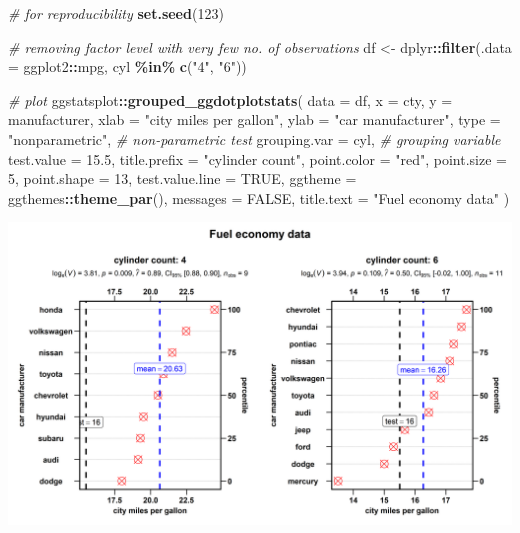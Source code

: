 \documentclass[
]{article}
\newenvironment{Shaded}{\begin{snugshade}}{\end{snugshade}}
\newcommand{\CommentTok}[1]{\textcolor[rgb]{0.56,0.35,0.01}{\textit{#1}}}
\newcommand{\DataTypeTok}[1]{\textcolor[rgb]{0.13,0.29,0.53}{#1}}
\newcommand{\DecValTok}[1]{\textcolor[rgb]{0.00,0.00,0.81}{#1}}
\newcommand{\FloatTok}[1]{\textcolor[rgb]{0.00,0.00,0.81}{#1}}
\newcommand{\KeywordTok}[1]{\textcolor[rgb]{0.13,0.29,0.53}{\textbf{#1}}}
\newcommand{\NormalTok}[1]{#1}
\newcommand{\OperatorTok}[1]{\textcolor[rgb]{0.81,0.36,0.00}{\textbf{#1}}}
\newcommand{\OtherTok}[1]{\textcolor[rgb]{0.56,0.35,0.01}{#1}}
\newcommand{\StringTok}[1]{\textcolor[rgb]{0.31,0.60,0.02}{#1}}
\begin{document}
\begin{Shaded}
\begin{Highlighting}[]
\CommentTok{\# for reproducibility}
\KeywordTok{set.seed}\NormalTok{(}\DecValTok{123}\NormalTok{)}

\CommentTok{\# removing factor level with very few no. of observations}
\NormalTok{df <{-}}\StringTok{ }\NormalTok{dplyr}\OperatorTok{::}\KeywordTok{filter}\NormalTok{(}\DataTypeTok{.data =}\NormalTok{ ggplot2}\OperatorTok{::}\NormalTok{mpg, cyl }\OperatorTok{\%in\%}\StringTok{ }\KeywordTok{c}\NormalTok{(}\StringTok{"4"}\NormalTok{, }\StringTok{"6"}\NormalTok{))}

\CommentTok{\# plot}
\NormalTok{ggstatsplot}\OperatorTok{::}\KeywordTok{grouped\_ggdotplotstats}\NormalTok{(}
  \DataTypeTok{data =}\NormalTok{ df,}
  \DataTypeTok{x =}\NormalTok{ cty,}
  \DataTypeTok{y =}\NormalTok{ manufacturer,}
  \DataTypeTok{xlab =} \StringTok{"city miles per gallon"}\NormalTok{,}
  \DataTypeTok{ylab =} \StringTok{"car manufacturer"}\NormalTok{,}
  \DataTypeTok{type =} \StringTok{"nonparametric"}\NormalTok{, }\CommentTok{\# non{-}parametric test}
  \DataTypeTok{grouping.var =}\NormalTok{ cyl, }\CommentTok{\# grouping variable}
  \DataTypeTok{test.value =} \FloatTok{15.5}\NormalTok{,}
  \DataTypeTok{title.prefix =} \StringTok{"cylinder count"}\NormalTok{,}
  \DataTypeTok{point.color =} \StringTok{"red"}\NormalTok{,}
  \DataTypeTok{point.size =} \DecValTok{5}\NormalTok{,}
  \DataTypeTok{point.shape =} \DecValTok{13}\NormalTok{,}
  \DataTypeTok{test.value.line =} \OtherTok{TRUE}\NormalTok{,}
  \DataTypeTok{ggtheme =}\NormalTok{ ggthemes}\OperatorTok{::}\KeywordTok{theme\_par}\NormalTok{(),}
  \DataTypeTok{messages =} \OtherTok{FALSE}\NormalTok{,}
  \DataTypeTok{title.text =} \StringTok{"Fuel economy data"}
\NormalTok{)}
\end{Highlighting}
\end{Shaded}

\includegraphics[width=1\linewidth]{./figures/paper-ggdotplotstats2-1}
\end{document}
